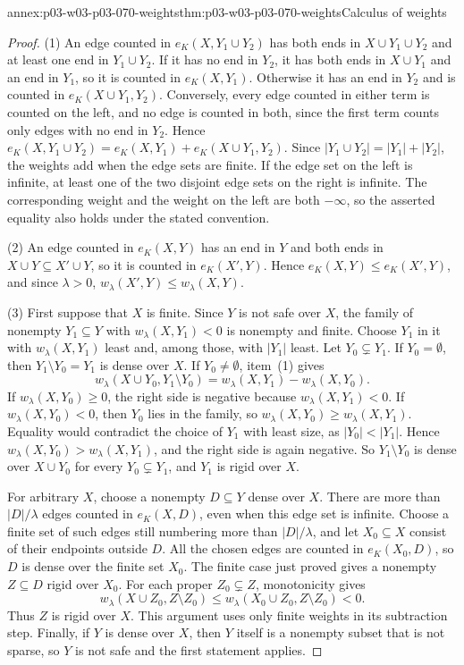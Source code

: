 \begin{annexitem}{annex:p03-w03-p03-070-weights}{thm:p03-w03-p03-070-weights}{Calculus of weights}
\begin{proof}
(1) An edge counted in \(e_K(X,Y_1\cup Y_2)\) has both ends in
\(X\cup Y_1\cup Y_2\) and at least one end in \(Y_1\cup Y_2\).  If it has no
end in \(Y_2\), it has both ends in \(X\cup Y_1\) and an end in \(Y_1\), so it
is counted in \(e_K(X,Y_1)\).  Otherwise it has an end in \(Y_2\) and is
counted in \(e_K(X\cup Y_1,Y_2)\).  Conversely, every edge counted in either
term is counted on the left, and no edge is counted in both, since the first
term counts only edges with no end in \(Y_2\).  Hence
\(e_K(X,Y_1\cup Y_2)=e_K(X,Y_1)+e_K(X\cup Y_1,Y_2)\).  Since
\(|Y_1\cup Y_2|=|Y_1|+|Y_2|\), the weights add when the edge sets are finite.
If the edge set on the left is infinite, at least one of the two disjoint
edge sets on the right is infinite.  The corresponding weight and the
weight on the left are both \(-\infty\), so the asserted equality also
holds under the stated convention.

(2) An edge counted in \(e_K(X,Y)\) has an end in \(Y\) and both ends in
\(X\cup Y\subseteq X'\cup Y\), so it is counted in \(e_K(X',Y)\).  Hence
\(e_K(X,Y)\leq e_K(X',Y)\), and since \(\lambda>0\),
\(w_\lambda(X',Y)\leq w_\lambda(X,Y)\).

(3) First suppose that \(X\) is finite.  Since \(Y\) is not safe over
\(X\), the family of nonempty
\(Y_1\subseteq Y\) with \(w_\lambda(X,Y_1)<0\) is nonempty and finite.
Choose \(Y_1\) in it with \(w_\lambda(X,Y_1)\) least and, among those, with
\(|Y_1|\) least.  Let \(Y_0\subsetneq Y_1\).  If \(Y_0=\emptyset\), then
\(Y_1\setminus Y_0=Y_1\) is dense over \(X\).  If \(Y_0\neq\emptyset\), item~(1)
gives
\[
 w_\lambda(X\cup Y_0,Y_1\setminus Y_0)=w_\lambda(X,Y_1)-w_\lambda(X,Y_0).
\]
If \(w_\lambda(X,Y_0)\geq0\), the right side is negative because
\(w_\lambda(X,Y_1)<0\).  If \(w_\lambda(X,Y_0)<0\), then \(Y_0\) lies in the
family, so \(w_\lambda(X,Y_0)\geq w_\lambda(X,Y_1)\).  Equality would
contradict the choice of \(Y_1\) with least size, as \(|Y_0|<|Y_1|\).  Hence
\(w_\lambda(X,Y_0)>w_\lambda(X,Y_1)\), and the right side is again negative.
So \(Y_1\setminus Y_0\) is dense over \(X\cup Y_0\) for every
\(Y_0\subsetneq Y_1\), and \(Y_1\) is rigid over \(X\).

For arbitrary \(X\), choose a nonempty \(D\subseteq Y\) dense over \(X\).
There are more than \(|D|/\lambda\) edges counted in \(e_K(X,D)\), even
when this edge set is infinite.  Choose a finite set of such edges still
numbering more than \(|D|/\lambda\), and let \(X_0\subseteq X\) consist of
their endpoints outside \(D\).  All the chosen edges are counted in
\(e_K(X_0,D)\), so \(D\) is dense over the finite set \(X_0\).  The finite
case just proved gives a nonempty \(Z\subseteq D\) rigid over \(X_0\).
For each proper \(Z_0\subsetneq Z\), monotonicity gives
\[
 w_\lambda(X\cup Z_0,Z\setminus Z_0)
 \leq w_\lambda(X_0\cup Z_0,Z\setminus Z_0)<0.
\]
Thus \(Z\) is rigid over \(X\).  This argument uses only finite weights
in its subtraction step.  Finally, if \(Y\) is dense over \(X\), then
\(Y\) itself is a nonempty subset that is not sparse, so \(Y\) is not safe
and the first statement applies.


\end{proof}
\end{annexitem}
